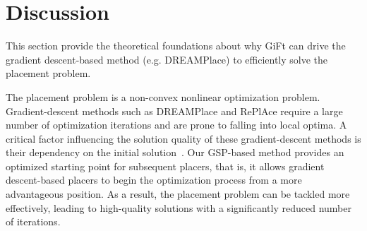 \section{Discussion} \label{sec:discussion}

This section provide the theoretical foundations about why GiFt can drive the gradient descent-based method (e.g. DREAMPlace) to efficiently solve the placement problem.

The placement problem is a non-convex nonlinear optimization problem. Gradient-descent methods such as DREAMPlace and RePlAce require a large number of optimization iterations and are prone to falling into local optima. A critical factor influencing the solution quality of these gradient-descent methods is their dependency on the initial solution~\cite{eplace_ms}. 
Our GSP-based method provides an optimized starting point for subsequent placers, that is, it allows gradient descent-based placers to begin the optimization process from a more advantageous position. As a result, the placement problem can be tackled more effectively, leading to high-quality solutions with a significantly reduced number of iterations.

